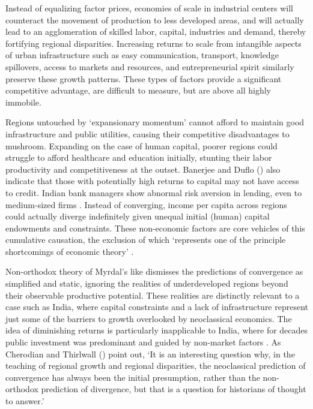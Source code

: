 \documentclass[a4paper, 11pt]{article}
\begin{document}
Instead of equalizing factor prices, economies of scale in industrial centers will counteract the movement of production to less developed areas, and will actually lead to an agglomeration of skilled labor, capital, industries and demand, thereby fortifying regional disparities.  Increasing returns to scale from intangible aspects of urban infrastructure such as easy communication, transport, knowledge spillovers, access to markets and resources, and entrepreneurial spirit similarly preserve these growth patterns.  These types of factors provide a significant competitive advantage, are difficult to measure, but are above all highly immobile.  \par
Regions untouched by ‘expansionary momentum’ cannot afford to maintain good infrastructure and public utilities, causing their competitive disadvantages to mushroom.  Expanding on the case of human capital, poorer regions could struggle to afford healthcare and education initially, stunting their labor productivity and competitiveness at the outset.  Banerjee and Duflo (\citeyear{banerjee_growth_2005}) also indicate that those with potentially high returns to capital may not have access to credit.  Indian bank managers show abnormal risk aversion in lending, even to medium-sized firms \citep{banerjee_what_2004}.  Instead of converging, income per capita across regions could actually diverge indefinitely given unequal initial (human) capital endowments and constraints.  These non-economic factors are core vehicles of this cumulative causation, the exclusion of which ‘represents one of the principle shortcomings of economic theory’ \citep{myrdal_economic_1957}. \par 
Non-orthodox theory of Myrdal’s like dismisses the predictions of convergence as simplified and static, ignoring the realities of underdeveloped regions beyond their observable productive potential.  These realities are distinctly relevant to a case such as India, where capital constraints and a lack of infrastructure represent just some of the barriers to growth overlooked by neoclassical economics.  The idea of diminishing returns is particularly inapplicable to India, where for decades public investment was predominant and guided by non-market factors \citep{ghosh_economic_1998}.  As Cherodian and Thirlwall (\citeyear{cherodian_regional_2015}) point out, ‘It is an interesting question why, in the teaching of regional growth and regional disparities, the neoclassical prediction of convergence has always been the initial presumption, rather than the non-orthodox prediction of divergence, but that is a question for historians of thought to answer.’
 
\end{document}
